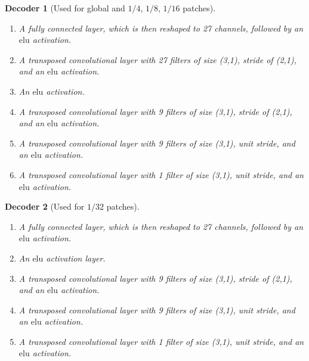 \documentclass[final,3p]{elsarticle}
\theoremstyle{break}
\newtheorem{decoder}{Decoder}
\begin{document}
\begin{decoder}[Used for global and $1/4$, $1/8$, $1/16$ patches]\label{model:d_incorrect}
\begin{enumerate}
    \item A fully connected layer, which is then reshaped to 27 channels, followed by an $\mathrm{elu}$ activation.
 	\item A transposed convolutional layer with 27 filters of size (3,1), stride of (2,1), and an $\mathrm{elu}$ activation.
 	\item An $\mathrm{elu}$ activation.
 	\item A transposed convolutional layer with 9 filters of size (3,1), stride of (2,1), and an $\mathrm{elu}$ activation.
 	\item A transposed convolutional layer with 9 filters of size (3,1), unit stride, and an $\mathrm{elu}$ activation.
 	\item A transposed convolutional layer with 1 filter of size (3,1), unit stride, and an $\mathrm{elu}$ activation.
\end{enumerate}
\end{decoder}
\begin{decoder}[Used for $1/32$ patches]\label{model:d_incorrect_32}
\begin{enumerate}
    \item A fully connected layer, which is then reshaped to 27 channels, followed by an $\mathrm{elu}$ activation.
    \item An $\mathrm{elu}$ activation layer.
 	\item A transposed convolutional layer with 9 filters of size (3,1), stride of (2,1), and an $\mathrm{elu}$ activation.
 	\item A transposed convolutional layer with 9 filters of size (3,1), unit stride, and an $\mathrm{elu}$ activation.
 	\item A transposed convolutional layer with 1 filter of size (3,1), unit stride, and an $\mathrm{elu}$ activation.
\end{enumerate}
\end{decoder}
\end{document}
